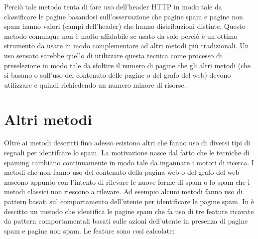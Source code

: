 Perciò tale metodo tenta di fare uso dell'header HTTP in modo tale da classificare le pagine basandosi sull'osservazione che pagine spam e pagine non spam	 hanno valori (campi dell'header) che hanno distribuzioni distinte. Questo metodo comunque non è molto affidabile se usato da solo perciò è un ottimo strumento da usare in modo complementare ad altri metodi più tradizionali. Un uso sensato sarebbe quello di utilizzare questa tecnica come processo di preselezione in modo tale da sfoltire il numero di pagine che gli altri metodi (che si basano o sull'uso del contenuto delle pagine o del grafo del web) devono utilizzare e quindi richiedendo un numero minore di risorse.

\section{Altri metodi}
Oltre ai metodi descritti fino adesso esistono altri che fanno uso di diversi tipi di segnali per identifcare lo spam. La motivazione nasce dal fatto che le tecniche di spaming cambiano continuamente in modo tale da ingannare i motori di ricerca. I metodi che non fanno uso del contenuto della pagina web o del grafo del web nascono appunto con l'intento di rilevare le nuove forme di spam o lo spam che i metodi classici non riescono a rilevare. Ad esempio alcuni metodi fanno uso di pattern basati sul comportamento dell'utente per identificare le pagine spam. In \cite{Liu:2008:UBO:1367497.1367645}  è descitto un metodo che identifica le pagine spam che fa uso di tre feature ricavate da pattern comportamentali basati sulle azioni dell'utente in presenza di  pagine spam e pagine non spam. Le feature sono cosi calcolate:

